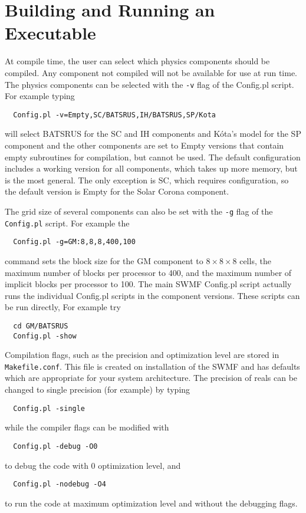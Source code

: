 \section{Building and Running an Executable}

At compile time, the user can select which physics components should be
compiled.  
Any component not compiled will not be available for
use at run time.  The physics components can be selected with the {\tt -v} flag
of the Config.pl script. For example typing
\begin{verbatim}
  Config.pl -v=Empty,SC/BATSRUS,IH/BATSRUS,SP/Kota
\end{verbatim}
will select BATSRUS for the SC and IH components and K\'ota's model for
the SP component and the other components are set to Empty versions
that contain empty subroutines for compilation, but cannot be used.
The default configuration includes a working version for all components, 
which takes up more memory, but is the most general.
The only exception is SC, which requires configuration, so the 
default version is Empty for the Solar Corona component.

The grid size of several components can also be set with the {\tt -g}
flag of the {\tt Config.pl} script. For example the 
\begin{verbatim}
  Config.pl -g=GM:8,8,8,400,100
\end{verbatim}
command sets the block size for the GM component to $8\times 8\times 8$ cells, 
the maximum number of blocks per processor to 400, 
and the maximum number of implicit blocks per processor to 100.
The main SWMF Config.pl script actually runs the individual Config.pl
scripts in the component versions. These scripts can be run directly,
For example try
\begin{verbatim}
  cd GM/BATSRUS
  Config.pl -show
\end{verbatim}
Compilation flags, such as the precision and optimization 
level are stored in {\tt Makefile.conf}. This file is created on
installation of the SWMF and has defaults which are appropriate for
your system architecture.  The precision of reals
can be changed to single precision (for example) by typing
\begin{verbatim}
  Config.pl -single
\end{verbatim}
while the compiler flags can be modified with
\begin{verbatim}
  Config.pl -debug -O0
\end{verbatim}
to debug the code with 0 optimization level, and
\begin{verbatim}
  Config.pl -nodebug -O4
\end{verbatim}
to run the code at maximum optimization level and without the debugging flags.

